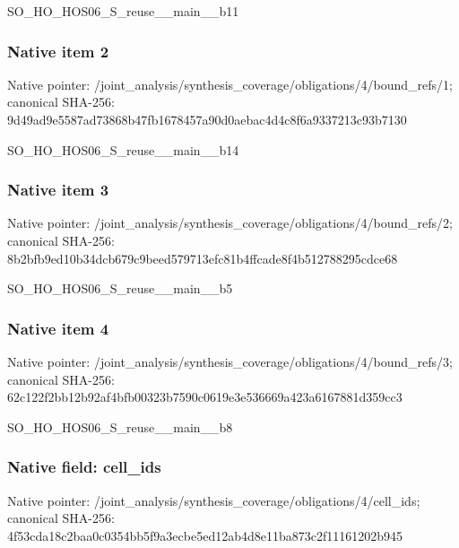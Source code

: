 \documentclass[10pt,a4paper]{article}
\begin{document}
\begingroup\raggedright\sloppy SO\_\allowbreak{}HO\_\allowbreak{}HOS06\_\allowbreak{}S\_\allowbreak{}reuse\_\allowbreak{}\_\allowbreak{}main\_\allowbreak{}\_\allowbreak{}b11\par\endgroup

\subsubsection{Native item 2}
Native pointer: /joint\_\allowbreak{}analysis/synthesis\_\allowbreak{}coverage/obligations/4/bound\_\allowbreak{}refs/1; canonical SHA-256: 9d49ad9e5587ad73868b47fb1678457a90d0aebac4d4c8f6a9337213c93b7130

\begingroup\raggedright\sloppy SO\_\allowbreak{}HO\_\allowbreak{}HOS06\_\allowbreak{}S\_\allowbreak{}reuse\_\allowbreak{}\_\allowbreak{}main\_\allowbreak{}\_\allowbreak{}b14\par\endgroup

\subsubsection{Native item 3}
Native pointer: /joint\_\allowbreak{}analysis/synthesis\_\allowbreak{}coverage/obligations/4/bound\_\allowbreak{}refs/2; canonical SHA-256: 8b2bfb9ed10b34dcb679c9beed579713efc81b4ffcade8f4b512788295cdce68

\begingroup\raggedright\sloppy SO\_\allowbreak{}HO\_\allowbreak{}HOS06\_\allowbreak{}S\_\allowbreak{}reuse\_\allowbreak{}\_\allowbreak{}main\_\allowbreak{}\_\allowbreak{}b5\par\endgroup

\subsubsection{Native item 4}
Native pointer: /joint\_\allowbreak{}analysis/synthesis\_\allowbreak{}coverage/obligations/4/bound\_\allowbreak{}refs/3; canonical SHA-256: 62c122f2bb12b92af4bfb00323b7590c0619e3e536669a423a6167881d359cc3

\begingroup\raggedright\sloppy SO\_\allowbreak{}HO\_\allowbreak{}HOS06\_\allowbreak{}S\_\allowbreak{}reuse\_\allowbreak{}\_\allowbreak{}main\_\allowbreak{}\_\allowbreak{}b8\par\endgroup

\subsubsection{Native field: cell\_\allowbreak{}ids}
Native pointer: /joint\_\allowbreak{}analysis/synthesis\_\allowbreak{}coverage/obligations/4/cell\_\allowbreak{}ids; canonical SHA-256: 4f53cda18c2baa0c0354bb5f9a3ecbe5ed12ab4d8e11ba873c2f11161202b945
\end{document}
